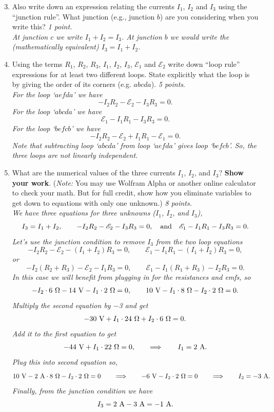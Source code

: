 \begin{enumerate}

\setcounter{enumi}{2}

\item Also write down an expression relating the currents  $I_1$, $I_2$ and $I_3$
using the ``junction rule''. What junction (e.g., junction $b$) are you considering when you write this? 
\emph{1 point.}\\

\emph{At junction $c$ we write $I_1 + I_2 = I_3$. At junction $b$ we would write the (mathematically
equivalent) $I_3 = I_1 + I_2$.}
\\[.5cm]

\item Using the terms $R_1$, $R_2$, $R_3$, $I_1$, $I_2$, $I_3$, $\mathscr{E}_1$ 
and $\mathscr{E}_2$ write down ``loop rule'' expressions for at least two different
loops. State explicitly what the loop is by giving the order of its corners (e.g. $abcda$). 
\emph{5 points}.\\

\emph{For the loop `$aefda$' we have
\[
- I_2 R_2 - \mathscr{E}_2 - I_3 R_3 = 0.
\]
For the loop `$abcda$' we have
\[
 \mathscr{E}_1 - I_1 R_1 - I_3 R_3 = 0.
\]
For the loop `$befcb$' we have
\[
- I_2 R_2 - \mathscr{E}_2 + I_1 R_1  - \mathscr{E}_1  = 0.
\]
Note that subtracting loop `$abcda$' from loop `$aefda$' gives loop `$befcb$'. So, the three loops are not
linearly independent.}

\newpage 
\item What are the numerical values of the three currents $I_1$, $I_2$, and $I_3$?
\textbf{Show your work}. (\emph{Note:} You may use Wolfram Alpha or another online calculator 
to check your math. But for full credit, show how you eliminate variables to get down to
equations with only one unknown.)
\emph{8 points.}\\[1cm]

\noindent
\emph{We have three equations for three unknowns ($I_1$, $I_2$, and $I_3$),
\[
I_3 = I_1 + I_2, \qquad
- I_2 R_2 - \mathscr{E}_2 - I_3 R_3 =0, \quad {\rm and} \quad
 \mathscr{E}_1 - I_1 R_1 - I_3 R_3 = 0.
\]
Let's use the junction condition to remove $I_3$ from the two loop equations
\[
- I_2 R_2 - \mathscr{E}_2 - (I_1 + I_2) R_3 =0, \qquad
 \mathscr{E}_1 - I_1 R_1 - (I_1 + I_2) R_3 = 0,
\]
or
\[
- I_2 (R_2 + R_3) - \mathscr{E}_2 - I_1 R_3 =0, \qquad
 \mathscr{E}_1 - I_1 (R_1 + R_3) -  I_2 R_3 = 0.
\]
In this case we will benefit from plugging in for the resistances and emfs, so
\[
- I_2 \cdot 6 \ \Omega - 14 \ {\rm V} - I_1 \cdot 2 \ \Omega =0, \qquad
10 \ {\rm V} - I_1 \cdot 8 \ \Omega -  I_2 \cdot 2 \ \Omega = 0.
\]
Multiply the second equation by $-$3 and get
\[
-30 \ {\rm V} +I_1 \cdot 24 \ \Omega +  I_2 \cdot 6 \ \Omega = 0.
\]
Add it to the first equation to get
\[
-44 \ {\rm V} + I_1 \cdot 22 \ \Omega =0, \qquad \Longrightarrow \qquad I_1 = 2 \ {\rm A}.
\]
Plug this into second equation so,
\[
10 \ {\rm V} - 2 \ {\rm A} \cdot 8 \ \Omega -  I_2 \cdot 2 \ \Omega = 0
\qquad \Longrightarrow \qquad -6 \ {\rm V} -  I_2 \cdot 2 \ \Omega = 0
\qquad \Longrightarrow \qquad I_2 = -3 \ {\rm A}.
\]
Finally, from the junction condition we have
\[
I_3 = 2 \ {\rm A} -3 \ {\rm A} = -1 \ {\rm A}.
\]
}

\end{enumerate}



